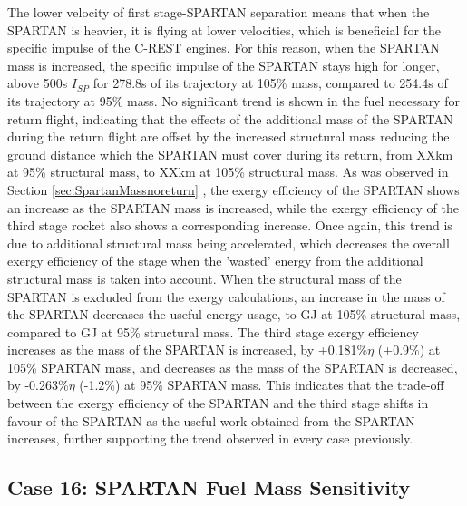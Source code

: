  The lower velocity of first stage-SPARTAN separation means that when the SPARTAN is heavier, it is flying at lower velocities, which is beneficial for the specific impulse of the C-REST engines. For this reason, when the SPARTAN mass is increased, the specific impulse of the SPARTAN stays high for longer, above 500s $I_{SP}$ for 278.8s of its trajectory at 105\% mass, compared to 254.4s of its trajectory at 95\% mass. 
 No  significant trend is shown in the fuel necessary for return flight, indicating that the effects of the  additional mass of the SPARTAN during the return flight are offset by the increased structural mass reducing the ground distance which the SPARTAN must cover during its return, from XXkm at 95\% structural mass, to XXkm at 105\% structural mass. 
As was observed in Section \ref{sec:SpartanMassnoreturn} , the exergy efficiency of the SPARTAN shows an increase as the SPARTAN mass is increased, while the exergy efficiency of the third stage rocket also shows a corresponding increase. 
Once again, this trend is due to additional structural mass being accelerated, which decreases the overall exergy efficiency of the stage when the 'wasted' energy from the additional structural mass is taken into account. When the structural mass of the SPARTAN is excluded from the exergy calculations, an increase in the mass of the SPARTAN decreases the useful energy usage, to \secondExergythirdStagemSPARTANOneHundredFive GJ at 105\% structural mass, compared to \secondExergythirdStagemSPARTANNinetyFive GJ at 95\% structural mass. 
The third stage exergy efficiency increases as the mass of the SPARTAN is increased, by +0.181\%$\eta$ (+0.9\%) at 105\% SPARTAN mass, and decreases as the mass of the SPARTAN is decreased, by -0.263\%$\eta$ (-1.2\%) at 95\% SPARTAN mass. This indicates that the trade-off between the exergy efficiency of the SPARTAN and the third stage shifts in favour of the SPARTAN as the useful work obtained from the SPARTAN increases, further supporting the trend observed in every case previously. 





\subsection{Case 16: SPARTAN Fuel Mass Sensitivity}


